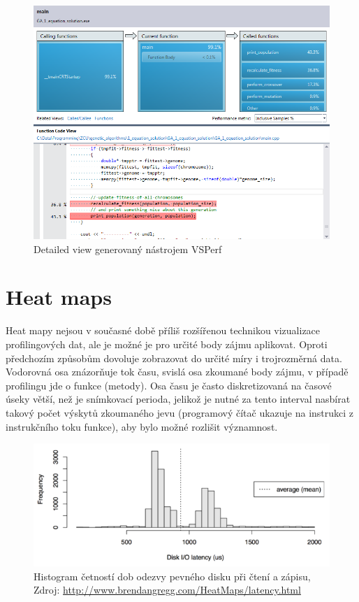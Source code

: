 \documentclass[czech,BP]{thesiskiv}
\begin{document}
\begin{figure}[h]
    \centering
    \includegraphics[interpolate,width=1.0\textwidth]{img/prof_detailgraph.png}
    \caption{Detailed view generovaný nástrojem VSPerf}
    \label{obr:detailview}
\end{figure}

\section {Heat maps}

Heat mapy nejsou v současné době příliš rozšířenou technikou vizualizace profilingových dat, ale je možné je pro určité body zájmu aplikovat. Oproti předchozím způsobům dovoluje zobrazovat do určité míry i trojrozměrná data. Vodorovná osa znázorňuje tok času, svislá osa zkoumané body zájmu, v případě profilingu jde o funkce (metody). Osa času je často diskretizovaná na časové úseky větší, než je snímkovací perioda, jelikož je nutné za tento interval nasbírat takový počet výskytů zkoumaného jevu (programový čítač ukazuje na instrukci z instrukčního toku funkce), aby bylo možné rozlišit významnost.

\begin{figure}[h]
    \centering
    \includegraphics[interpolate,width=1.0\textwidth]{img/prof_histogram.png}
    \caption{Histogram četností dob odezvy pevného disku při čtení a zápisu, Zdroj: \url{http://www.brendangregg.com/HeatMaps/latency.html}}
    \label{obr:heathistoview}
\end{figure}
\end{document}
